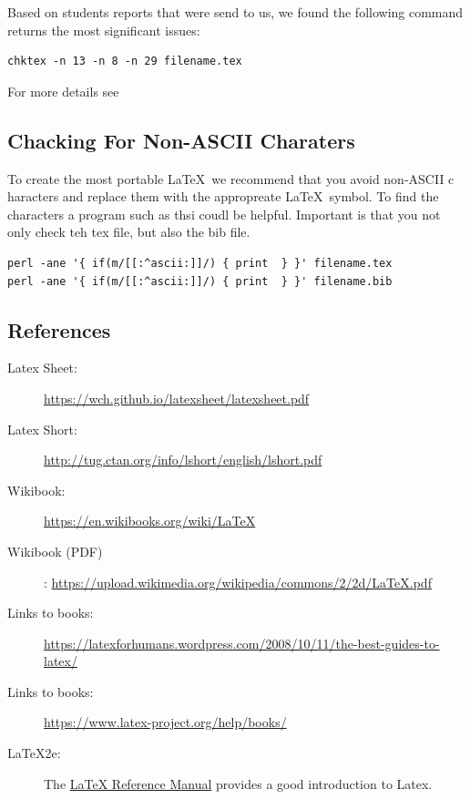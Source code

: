 Based on students reports that were send to us, we found the following
command returns the most significant issues:

\begin{lstlisting}
chktex -n 13 -n 8 -n 29 filename.tex
\end{lstlisting}

For more details see


\subsection{Chacking For Non-ASCII Charaters}

To create the most portable \LaTeX~we recommend that you avoid
non-ASCII c haracters and replace them with the appropreate
\LaTeX~symbol. To find the characters a program such as thsi coudl be
helpful. Important is that you not only check teh tex file, but also
the bib file.

\begin{lstlisting}
perl -ane '{ if(m/[[:^ascii:]]/) { print  } }' filename.tex
perl -ane '{ if(m/[[:^ascii:]]/) { print  } }' filename.bib
\end{lstlisting}

\subsection{References}

\begin{description}


\item[Latex Sheet:]    \url{https://wch.github.io/latexsheet/latexsheet.pdf}

\item[Latex Short:]    \url{http://tug.ctan.org/info/lshort/english/lshort.pdf}

\item[Wikibook:]       \url{https://en.wikibooks.org/wiki/LaTeX}
\item[Wikibook (PDF)]: \url{https://upload.wikimedia.org/wikipedia/commons/2/2d/LaTeX.pdf}

\item [Links to books:] \url{https://latexforhumans.wordpress.com/2008/10/11/the-best-guides-to-latex/}
\item [Links to books:] \url{https://www.latex-project.org/help/books/}
\item [LaTeX2e:]
  The
  \href{http://texdoc.net/texmf-dist/doc/latex/latex2e-help-texinfo/latex2e.pdf}{LaTeX
  Reference Manual} provides a good introduction to Latex.

\end{description}


